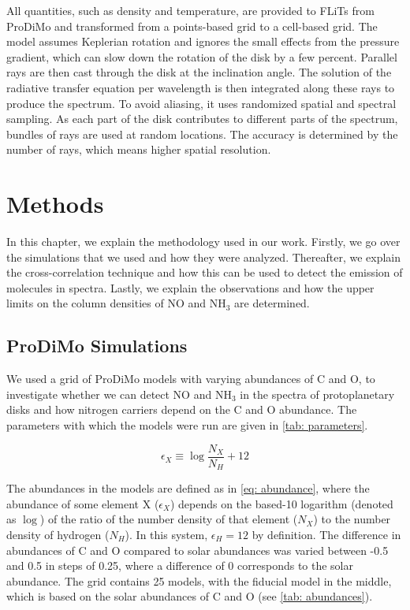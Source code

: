 \documentclass[oneside, single, authoryear, semicolon, 12pt]{lion-msc}
\newcommand{\4}{$_4$}
\newcommand{\3}{$_3$}
\newcommand{\2}{$_2$}
\begin{document}
All quantities, such as density and temperature, are provided to FLiTs from ProDiMo and transformed from a points-based grid to a cell-based grid. The model assumes Keplerian rotation and ignores the small effects from the pressure gradient, which can slow down the rotation of the disk by a few percent. Parallel rays are then cast through the disk at the inclination angle. The solution of the radiative transfer equation per wavelength is then integrated along these rays to produce the spectrum. To avoid aliasing, it uses randomized spatial and spectral sampling. As each part of the disk contributes to different parts of the spectrum, bundles of rays are used at random locations. The accuracy is determined by the number of rays, which means higher spatial resolution.




\chapter{Methods}\label{Ch: Methods}
In this chapter, we explain the methodology used in our work. Firstly, we go over the simulations that we used and how they were analyzed. Thereafter, we explain the cross-correlation technique and how this can be used to detect the emission of molecules in spectra. Lastly, we explain the observations and how the upper limits on the column densities of NO and NH\3 are determined.

\section{ProDiMo Simulations}
We used a grid of ProDiMo models with varying abundances of C and O, to investigate whether we can detect NO and NH\3 in the spectra of protoplanetary disks and how nitrogen carriers depend on the C and O abundance. The parameters with which the models were run are given in \autoref{tab: parameters}.

\begin{equation}
    \epsilon_X\equiv\log\frac{N_X}{N_H}+12
\label{eq: abundance}
\end{equation}

The abundances in the models are defined as in \autoref{eq: abundance}, where the abundance of some element X ($\epsilon_X$) depends on the based-10 logarithm (denoted as $\log$) of the ratio of the number density of that element ($N_X$) to the number density of hydrogen ($N_H$). In this system, $\epsilon_H=12$ by definition. The difference in abundances of C and O compared to solar abundances was varied between -0.5 and 0.5 in steps of 0.25, where a difference of 0 corresponds to the solar abundance. The grid contains 25 models, with the fiducial model in the middle, which is based on the solar abundances of C and O (see \autoref{tab: abundances}).
\end{document}
